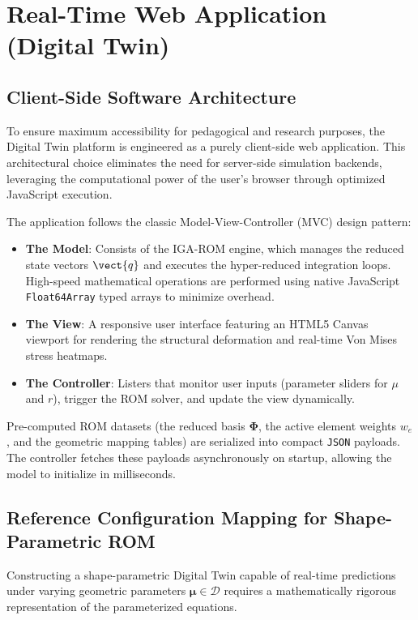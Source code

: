 \chapter{Real-Time Web Application (Digital Twin)}
\label{ch:digital_twin}

\section{Client-Side Software Architecture}
To ensure maximum accessibility for pedagogical and research purposes, the Digital Twin platform is engineered as a purely client-side web application. This architectural choice eliminates the need for server-side simulation backends, leveraging the computational power of the user's browser through optimized JavaScript execution.

The application follows the classic Model-View-Controller (MVC) design pattern:
\begin{itemize}
    \item \textbf{The Model}: Consists of the IGA-ROM engine, which manages the reduced state vectors $\vect{q}$ and executes the hyper-reduced integration loops. High-speed mathematical operations are performed using native JavaScript \texttt{Float64Array} typed arrays to minimize overhead.
    \item \textbf{The View}: A responsive user interface featuring an HTML5 Canvas viewport for rendering the structural deformation and real-time Von Mises stress heatmaps.
    \item \textbf{The Controller}: Listers that monitor user inputs (parameter sliders for $\mu$ and $r$), trigger the ROM solver, and update the view dynamically.
\end{itemize}

Pre-computed ROM datasets (the reduced basis $\boldsymbol{\Phi}$, the active element weights $w_e$, and the geometric mapping tables) are serialized into compact \texttt{JSON} payloads. The controller fetches these payloads asynchronously on startup, allowing the model to initialize in milliseconds.

\section{Reference Configuration Mapping for Shape-Parametric ROM}
Constructing a shape-parametric Digital Twin capable of real-time predictions under varying geometric parameters $\boldsymbol{\mu} \in \mathcal{D}$ requires a mathematically rigorous representation of the parameterized equations.

